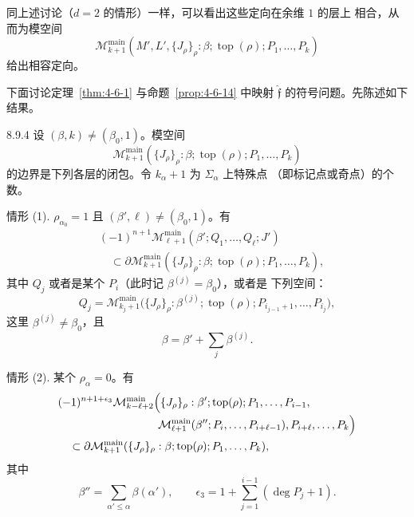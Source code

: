 同上述讨论（$d=2$ 的情形）一样，可以看出这些定向在余维 $1$ 的层上
相合，从而为模空间
\[
 \mathcal M_{k+1}^{\mathrm{main}}
 (M',L',\{J_\rho\}_\rho:\beta;\operatorname{top}(\rho);
 P_1,\ldots,P_k)
\]
给出相容定向。

下面讨论定理~\ref{thm:4-6-1} 与命题~\ref{prop:4-6-14} 中映射
$\widehat{\mathfrak f}$ 的符号问题。先陈述如下结果。

\begin{proposition}{8.9.4}\label{prop:8-9-4}
设 $(\beta,k)\ne(\beta_0,1)$。模空间
\[
 \mathcal M_{k+1}^{\mathrm{main}}
 (\{J_\rho\}_\rho:\beta;\operatorname{top}(\rho);
 P_1,\ldots,P_k)
\]
的边界是下列各层的闭包。令 $k_\alpha+1$ 为 $\Sigma_\alpha$ 上特殊点
（即标记点或奇点）的个数。

\par\smallskip\noindent
\textup{情形 (1).}
$\rho_{\alpha_0}=1$ 且 $(\beta',\ell)\ne(\beta_0,1)$。有
\[
\begin{aligned}
 &(-1)^{n+1}
 \mathcal M_{\ell+1}^{\mathrm{main}}
 (\beta';Q_1,\ldots,Q_\ell;J')\\
 &\quad\subset
 \partial\mathcal M_{k+1}^{\mathrm{main}}
 (\{J_\rho\}_\rho:\beta;\operatorname{top}(\rho);
 P_1,\ldots,P_k),
\end{aligned}
\]
其中 $Q_j$ 或者是某个 $P_i$（此时记 $\beta^{(j)}=\beta_0$），或者是
下列空间：
\[
 Q_j=
 \mathcal M_{k_j+1}^{\mathrm{main}}
 \bigl(\{J_\rho\}_\rho:\beta^{(j)};\operatorname{top}(\rho);
 P_{i_{j-1}+1},\ldots,P_{i_j}\bigr),
\]
这里 $\beta^{(j)}\ne\beta_0$，且
\[
 \beta=\beta'+\sum_j\beta^{(j)}.
\]

\par\smallskip\noindent
\textup{情形 (2).}
某个 $\rho_\alpha=0$。有
\[
\begin{aligned}
 &(-1)^{n+1+\epsilon_3}
 \mathcal M_{k-\ell+2}^{\mathrm{main}}
 \Bigl(\{J_\rho\}_\rho:\beta';\operatorname{top}(\rho);
 P_1,\ldots,P_{i-1},\\[-2pt]
 &\hspace{9em}
 \mathcal M_{\ell+1}^{\mathrm{main}}
 (\beta'';P_i,\ldots,P_{i+\ell-1}),
 P_{i+\ell},\ldots,P_k\Bigr)\\
 &\quad\subset
 \partial\mathcal M_{k+1}^{\mathrm{main}}
 (\{J_\rho\}_\rho:\beta;\operatorname{top}(\rho);
 P_1,\ldots,P_k),
\end{aligned}
\]
其中
\[
 \beta''=\sum_{\alpha'\leq\alpha}\beta(\alpha'),
 \qquad
 \epsilon_3=1+\sum_{j=1}^{i-1}(\deg P_j+1).
\]


\end{proposition}
